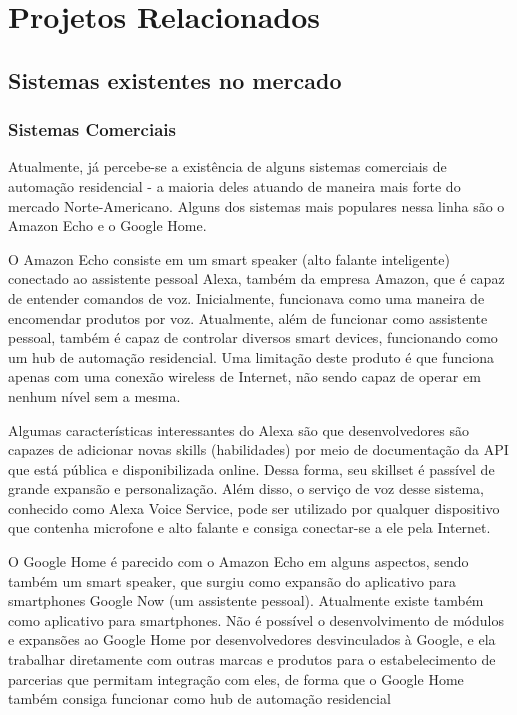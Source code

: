 \chapter{Projetos Relacionados}

\section{Sistemas existentes no mercado}

\subsection{Sistemas Comerciais}
Atualmente, já percebe-se a existência de alguns sistemas comerciais de automação residencial - a maioria deles atuando de maneira mais forte do mercado Norte-Americano. Alguns dos sistemas mais populares nessa linha são o Amazon Echo e o Google Home.

O Amazon Echo consiste em um smart speaker (alto falante inteligente) conectado ao assistente pessoal Alexa, também da empresa Amazon, que é capaz de entender comandos de voz. Inicialmente, funcionava como uma maneira de encomendar produtos por voz. Atualmente, além de funcionar como assistente pessoal, também é capaz de controlar diversos smart devices, funcionando como um hub de automação residencial. Uma limitação deste produto é que funciona apenas com uma conexão wireless de Internet, não sendo capaz de operar em nenhum nível sem a mesma.

Algumas características interessantes do Alexa são que desenvolvedores são capazes de adicionar novas skills (habilidades) por meio de documentação da API que está pública e disponibilizada online. Dessa forma, seu skillset é passível de grande expansão e personalização. Além disso, o serviço de voz desse sistema, conhecido como Alexa Voice Service, pode ser utilizado por qualquer dispositivo que contenha microfone e alto falante e consiga conectar-se a ele pela Internet.

O Google Home é parecido com o Amazon Echo em alguns aspectos, sendo também um smart speaker, que surgiu como expansão do aplicativo para smartphones Google Now (um assistente pessoal). Atualmente existe também como aplicativo para smartphones. Não é possível o desenvolvimento de módulos e expansões ao Google Home por desenvolvedores desvinculados à Google, e ela trabalhar diretamente com outras marcas e produtos para o estabelecimento de parcerias que permitam integração com eles, de forma que o Google Home também consiga funcionar como hub de automação residencial

